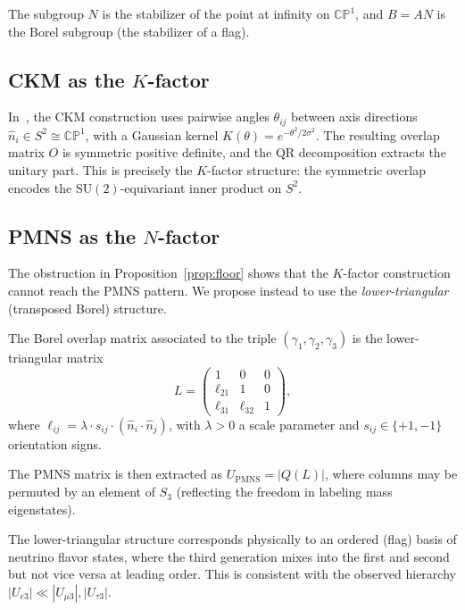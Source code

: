 \documentclass[epjc3]{svjour3}
\newcommand{\SUtwo}{\mathrm{SU}(2)}
\newcommand{\CP}{\mathbb{CP}^1}
\begin{document}
The subgroup $N$ is the stabilizer of the point at infinity on $\CP$,
and $B = AN$ is the Borel subgroup (the stabilizer of a flag).

\subsection{CKM as the $K$-factor}

In~\cite{Gentry:CKM}, the CKM construction uses pairwise angles
$\theta_{ij}$ between axis directions $\hat{n}_i \in S^2 \cong \CP$,
with a Gaussian kernel $K(\theta) = e^{-\theta^2/2\sigma^2}$.
The resulting overlap matrix $O$ is symmetric positive definite,
and the QR decomposition extracts the unitary part. This is precisely
the $K$-factor structure: the symmetric overlap encodes the
$\SUtwo$-equivariant inner product on $S^2$.

\subsection{PMNS as the $N$-factor}

The obstruction in Proposition~\ref{prop:floor} shows that the $K$-factor
construction cannot reach the PMNS pattern. We propose instead to use
the \emph{lower-triangular} (transposed Borel) structure.

\begin{definition}
\label{def:borel}
The Borel overlap matrix associated to the triple $(\gamma_1, \gamma_2, \gamma_3)$
is the lower-triangular matrix
\begin{equation}
  L = \begin{pmatrix} 1 & 0 & 0 \\ \ell_{21} & 1 & 0 \\ \ell_{31} & \ell_{32} & 1 \end{pmatrix},
  \label{eq:L_matrix}
\end{equation}
where $\ell_{ij} = \lambda \cdot s_{ij} \cdot (\hat{n}_i \cdot \hat{n}_j)$,
with $\lambda > 0$ a scale parameter and $s_{ij} \in \{+1, -1\}$ orientation signs.
\end{definition}

The PMNS matrix is then extracted as $U_\mathrm{PMNS} = |Q(L)|$, where
columns may be permuted by an element of $S_3$ (reflecting the
freedom in labeling mass eigenstates).

The lower-triangular structure corresponds physically to an ordered
(flag) basis of neutrino flavor states, where the third generation
mixes into the first and second but not vice versa at leading order.
This is consistent with the observed hierarchy $|U_{e3}| \ll |U_{\mu3}|,
|U_{\tau 3}|$.
\end{document}
